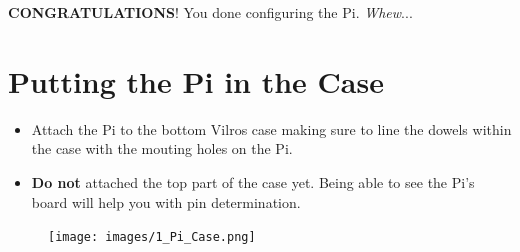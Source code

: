 \documentclass{article}
\begin{document}
\textbf{CONGRATULATIONS}! You done configuring the Pi. \textit{Whew}...

\section{Putting the Pi in the Case}
\begin{itemize}
  \item Attach the Pi to the bottom Vilros case making sure to line the dowels within the case with the mouting holes on the Pi.
  \item \textbf{Do not} attached the top part of the case yet. Being able to see the Pi's board will help you with pin determination.
\end{itemize}

\begin{figure}
\texttt{[image: images/1\_Pi\_Case.png]}
\end{figure}
\end{document}
